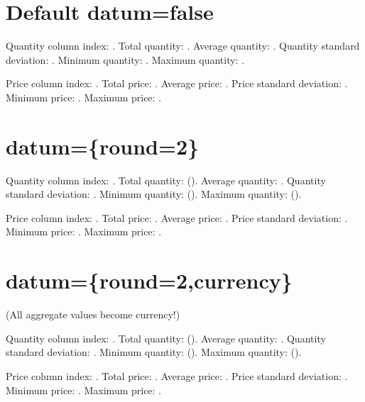\documentclass[12pt]{article}
\begin{document}
 \section{Default datum=false} 


Quantity column index: .
Total quantity: .
Average quantity: .
Quantity standard deviation: .
Minimum quantity: .
Maximum quantity: . 

Price column index: .
Total price: .
Average price: .
Price standard deviation: .
Minimum price: .
Maximum price: . 

\section{datum=\{round=2\}} 


Quantity column index: .
Total quantity: 
(\DTLget[sum]{\theTotal}\DTLdatumvalue{\theTotal}).
Average quantity: .
Quantity standard deviation: .
Minimum quantity: 
(\DTLget[min]{\theMin}\DTLdatumvalue{\theMin}).
Maximum quantity: 
(\DTLget[max]{\theMax}\DTLdatumvalue{\theMax}). 

Price column index: .
Total price: .
Average price: .
Price standard deviation: .
Minimum price: .
Maximum price: . 

\section{datum=\{round=2,currency\}} (All aggregate values become currency!) 


Quantity column index: .
Total quantity: 
(\DTLget[sum]{\theTotal}\DTLdatumvalue{\theTotal}).
Average quantity: .
Quantity standard deviation: .
Minimum quantity: 
(\DTLget[min]{\theMin}\DTLdatumvalue{\theMin}).
Maximum quantity: 
(\DTLget[max]{\theMax}\DTLdatumvalue{\theMax}). 

Price column index: .
Total price: .
Average price: .
Price standard deviation: .
Minimum price: .
Maximum price: . 
\end{document}
